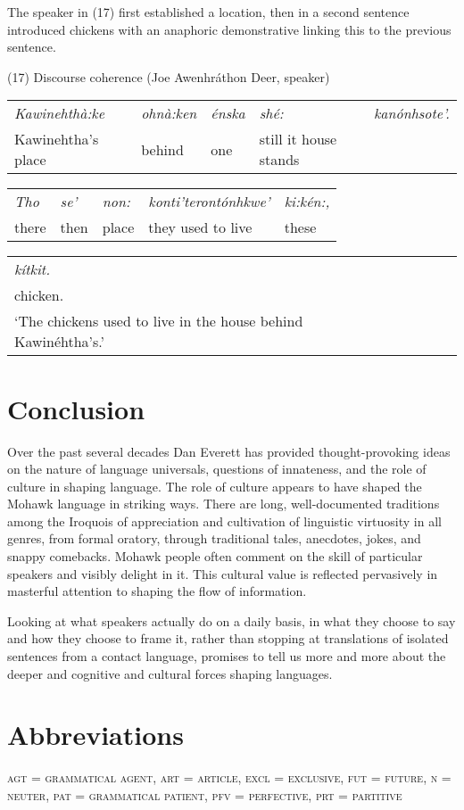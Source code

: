 \documentclass[output=paper,colorlinks,citecolor=brown
]{langscibook}
\begin{document}
The speaker in (17) first established a location, then in a second sentence introduced chickens with an anaphoric demonstrative linking this to the previous sentence.\bigskip


(17) Discourse coherence (Joe Awenhráthon Deer, speaker)\\

\begin{tabular}{lllll}
\emph{Kawinehthà:ke} & \emph{ohnà:ken} & \emph{énska} & \emph{shé:} &\emph{kanónhsote'.}\\

Kawinehtha's place & behind & one & still it house stands
\end{tabular}\bigskip

\begin{tabular}{lllll}
\emph{Tho} & \emph{se'} & \emph{non:} & \emph{konti'terontónhkwe'} & \emph{ki:kén:,}\\

there & then & place & they used to live & these
\end{tabular}\bigskip

\begin{tabular}{lllll}
\emph{kítkit.}\\

chicken.\\

`The chickens used to live in the house behind Kawinéhtha's.'
\end{tabular}\bigskip


\section{Conclusion}

Over the past several decades Dan Everett has provided thought-provoking ideas on the nature of language universals, questions of innateness, and the role of culture in shaping language. The role of culture appears to have shaped the Mohawk language in striking ways. There are long, well-documented traditions among the Iroquois of appreciation and cultivation of linguistic virtuosity in all genres, from formal oratory, through traditional tales, anecdotes, jokes, and snappy comebacks. Mohawk people often comment on the skill of particular speakers and visibly delight in it. This cultural value is reflected pervasively in masterful attention to shaping the flow of information.

Looking at what speakers actually do on a daily basis, in what they choose to say and how they choose to frame it, rather than stopping at translations of isolated sentences from a contact language, promises to tell us more and more about the deeper and cognitive and cultural forces shaping languages.

\section*{Abbreviations}

\textsc{agt = grammatical agent, art = article, excl = exclusive, fut =
future, n = neuter, pat = grammatical patient, pfv = perfective, prt =
partitive}

\printbibliography[heading=subbibliography,notkeyword=this]
\end{document}
